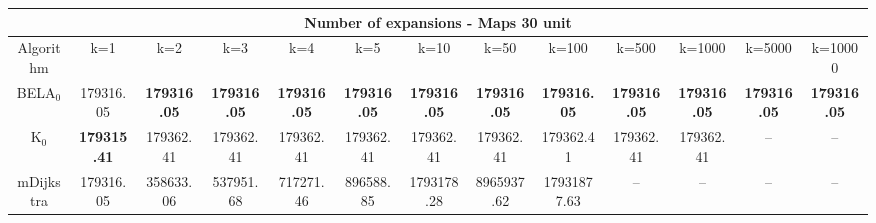 \begin{tabular}{c|cccccccccccc}\toprule
\multicolumn{13}{c}{Number of expansions - Maps 30 unit}\\ \midrule
Algorithm & k=1 & k=2 & k=3 & k=4 & k=5 & k=10 & k=50 & k=100 & k=500 & k=1000 & k=5000 & k=10000 \\ \midrule
BELA$_0$ & 179316.05 & \textbf{179316.05} & \textbf{179316.05} & \textbf{179316.05} & \textbf{179316.05} & \textbf{179316.05} & \textbf{179316.05} & \textbf{179316.05} & \textbf{179316.05} & \textbf{179316.05} & \textbf{179316.05} & \textbf{179316.05} \\
K$_0$ & \textbf{179315.41} & 179362.41 & 179362.41 & 179362.41 & 179362.41 & 179362.41 & 179362.41 & 179362.41 & 179362.41 & 179362.41 & -- & -- \\
mDijkstra & 179316.05 & 358633.06 & 537951.68 & 717271.46 & 896588.85 & 1793178.28 & 8965937.62 & 17931877.63 & -- & -- & -- & -- \\ \bottomrule 
\end{tabular}
